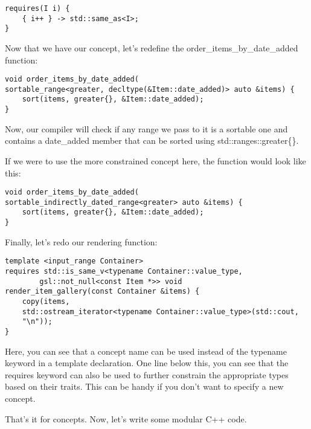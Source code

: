 \begin{lstlisting}[style=styleCXX]
requires(I i) {
	{ i++ } -> std::same_as<I>;
}
\end{lstlisting}

Now that we have our concept, let's redefine the order\_items\_by\_date\_added function:

\begin{lstlisting}[style=styleCXX]
void order_items_by_date_added(
sortable_range<greater, decltype(&Item::date_added)> auto &items) {
	sort(items, greater{}, &Item::date_added);
}
\end{lstlisting}

Now, our compiler will check if any range we pass to it is a sortable one and contains a date\_added member that can be sorted using std::ranges::greater\{\}.

If we were to use the more constrained concept here, the function would look like this:

\begin{lstlisting}[style=styleCXX]
void order_items_by_date_added(
sortable_indirectly_dated_range<greater> auto &items) {
	sort(items, greater{}, &Item::date_added);
}
\end{lstlisting}

Finally, let's redo our rendering function:

\begin{lstlisting}[style=styleCXX]
template <input_range Container>
requires std::is_same_v<typename Container::value_type,
		gsl::not_null<const Item *>> void
render_item_gallery(const Container &items) {
	copy(items,
	std::ostream_iterator<typename Container::value_type>(std::cout,
	"\n"));
}
\end{lstlisting}

Here, you can see that a concept name can be used instead of the typename keyword in a template declaration. One line below this, you can see that the requires keyword can also be used to further constrain the appropriate types based on their traits. This can be handy if you don't want to specify a new concept.

That's it for concepts. Now, let's write some modular C++ code.

